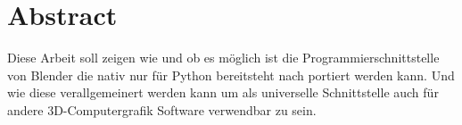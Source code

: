 \section*{Abstract}

Diese Arbeit soll zeigen wie und ob es möglich ist die Programmierschnittstelle von Blender die nativ nur für Python bereitsteht nach \CS portiert werden kann. Und wie diese verallgemeinert werden kann um als universelle Schnittstelle auch für andere 3D-Computergrafik Software verwendbar zu sein. 
